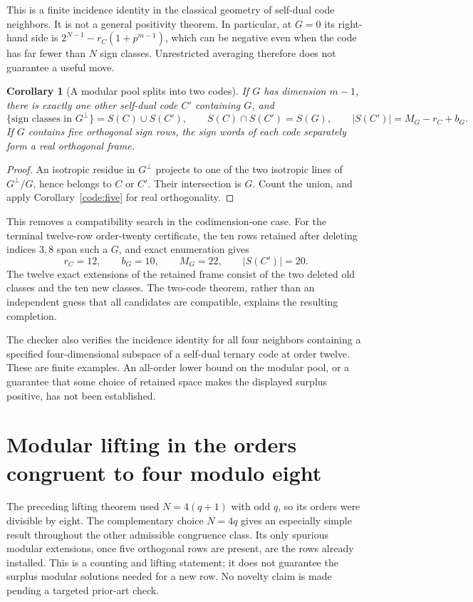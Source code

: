 \documentclass[11pt]{article}
\newtheorem{corollary}[theorem]{Corollary}
\begin{document}
This is a finite incidence identity in the classical geometry of
self-dual code neighbors. It is not a general positivity theorem.
In particular, at $G=0$ its right-hand side is
$2^{N-1}-r_C(1+p^{m-1})$, which can be negative even when the
code has far fewer than $N$ sign classes. Unrestricted averaging
therefore does not guarantee a useful move.

\begin{corollary}[A modular pool splits into two codes]
\label{code:two-codes}
If $G$ has dimension $m-1$, there is exactly one other self-dual
code $C'$ containing $G$, and
\[
 \{ \text{sign classes in }G^\perp\}=S(C)\cup S(C'),\qquad
 S(C)\cap S(C')=S(G),\qquad
 |S(C')|=M_G-r_C+b_G.
\]
If $G$ contains five orthogonal sign rows, the sign words of each
code separately form a real orthogonal frame.
\end{corollary}
\begin{proof}
An isotropic residue in $G^\perp$ projects to one of the two
isotropic lines of $G^\perp/G$, hence belongs to $C$ or $C'$.
Their intersection is $G$. Count the union, and apply
Corollary~\ref{code:five} for real orthogonality.
\end{proof}

This removes a compatibility search in the codimension-one case.
For the terminal twelve-row order-twenty certificate, the ten rows
retained after deleting indices $3,8$ span such a $G$, and exact
enumeration gives
\[
 r_C=12,\qquad b_G=10,\qquad M_G=22,\qquad |S(C')|=20.
\]
The twelve exact extensions of the retained frame consist of the two
deleted old classes and the ten new classes. The two-code theorem,
rather than an independent guess that all candidates are compatible,
explains the resulting completion.

The checker also verifies the incidence identity for all four
neighbors containing a specified four-dimensional subspace of a
self-dual ternary code at order twelve. These are finite examples.
An all-order lower bound on the modular pool, or a guarantee that
some choice of retained space makes the displayed surplus positive,
has not been established.
\section{Modular lifting in the orders congruent to four modulo eight}
\label{sec:four-mod-eight-lifting}

The preceding lifting theorem used $N=4(q+1)$ with odd $q$, so its
orders were divisible by eight. The complementary choice $N=4q$
gives an especially simple result throughout the other admissible
congruence class. Its only spurious modular extensions, once five
orthogonal rows are present, are the rows already installed.
This is a counting and lifting statement; it does not guarantee the
surplus modular solutions needed for a new row. No novelty claim is
made pending a targeted prior-art check.
\end{document}
